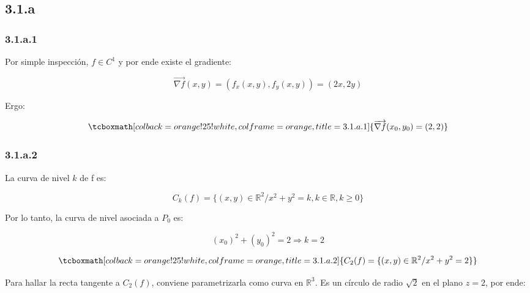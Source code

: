 \documentclass{article}
\renewcommand{\Bbb}{\mathbb}
\begin{document}
\subsection*{3.1.a}
\label{subsec:3.1.a}

\subsubsection*{3.1.a.1}
\label{subsubsec:3.1.a.1}

Por simple inspección, $f \in C^1$ y por ende existe el gradiente:

\begin{equation}
\overrightarrow{ \nabla f }(x,y) = (f_x(x,y), f_y(x,y)) = (2x, 2y)
\end{equation}

Ergo:

\begin{equation}
\tcboxmath[colback=orange!25!white,colframe=orange,title=3.1.a.1]
{
\overrightarrow{ \nabla f }(x_0,y_0) = (2, 2)
}
\end{equation}

\subsubsection*{3.1.a.2}
\label{subsubsec:3.1.a.2}

La curva de nivel $k$ de f es:

\begin{equation}
C_k(f) = \{ (x,y) \in \Bbb R^2 / x^2 + y^2 = k, k \in \Bbb R, k \geq 0 \}
\end{equation}

Por lo tanto, la curva de nivel asociada a $P_0$ es:

\begin{equation}
(x_0)^2 + (y_0)^2 = 2 \Rightarrow k = 2
\end{equation}

\begin{equation}
\tcboxmath[colback=orange!25!white,colframe=orange,title=3.1.a.2]
{
C_2(f) = \{ (x,y) \in \Bbb R^2 / x^2 + y^2 = 2 \}
}
\end{equation}

Para hallar la recta tangente a $C_2(f)$, conviene parametrizarla como curva en $\Bbb R^3$. Es un círculo de radio $\sqrt{2}$ en el plano $z = 2$, por ende:
\end{document}
